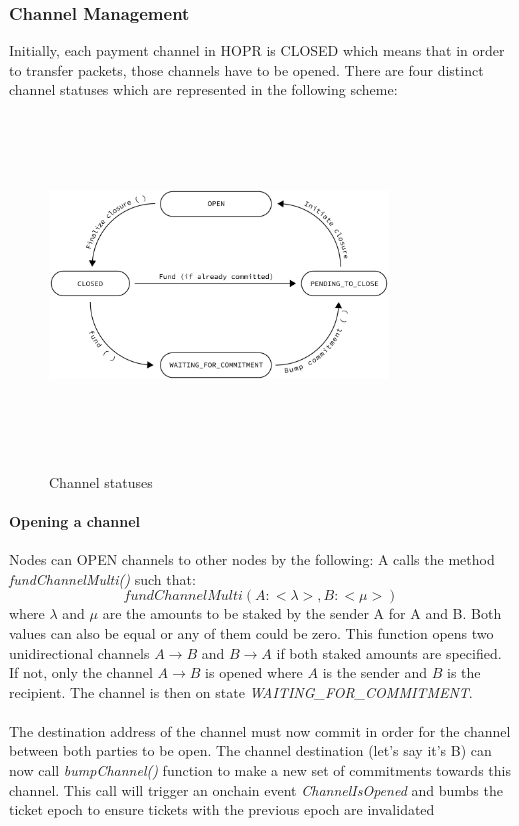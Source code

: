 \subsubsection{Channel Management}
Initially, each payment channel in HOPR is CLOSED which means that in order to transfer packets, those channels have to be opened. There are four distinct channel statuses which are represented in the following scheme:

\begin{figure}[H]
    \centering
    \includegraphics[width=9cm,height=9cm,keepaspectratio]{../yellowpaper/images/states1.png}
\label{fig:channel statuses}
    \caption{Channel statuses}
\end{figure}

\paragraph{Opening a channel} Nodes can OPEN channels to other nodes by the following:
A calls the method \textit{fundChannelMulti()} such that:
$$fundChannelMulti(A: <\lambda>, B:<\mu> )$$ where $\lambda$ and $\mu$ are the amounts to be staked by the sender A for A and B. Both values can also be equal or any of them could be zero. This function opens two unidirectional channels $A\rightarrow B$ and $B\rightarrow A$ if both staked amounts are specified. If not, only the channel $A\rightarrow B$ is opened where $A$ is the sender and $B$ is the recipient.
The channel is then on state \textit{WAITING\_FOR\_COMMITMENT}.
\\~\\The destination address of the channel must now commit in order for the channel between both parties to be open.
The channel destination (let's say it's B) can now call \textit{bumpChannel()} function to make a new set of commitments towards this channel. This call will trigger an onchain event \textit{ChannelIsOpened} and bumbs the ticket epoch to ensure tickets with the previous epoch are invalidated


